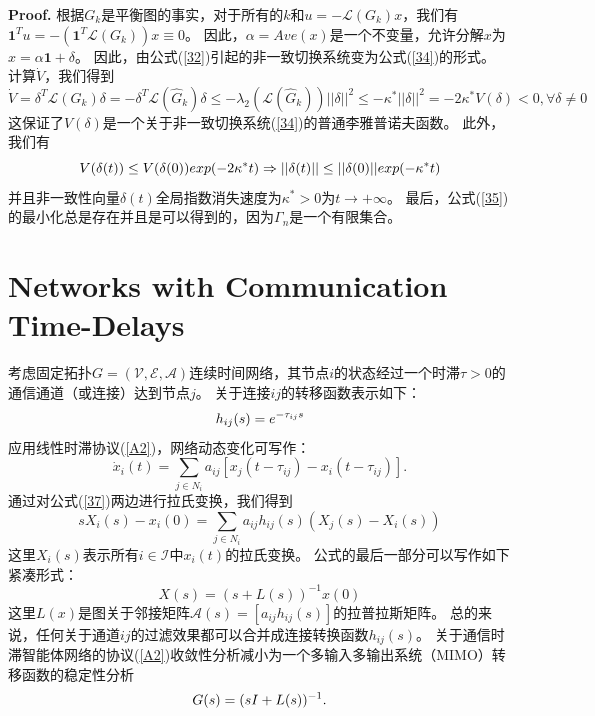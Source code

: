 \documentclass{article}
\begin{document}
\noindent \textbf{Proof.}
根据$G_k$是平衡图的事实，对于所有的$k$和$u=-\mathcal{L}(G_k)x$，我们有$\mathbf{1}^Tu=-(\mathbf{1}^T\mathcal{L}(G_k))x\equiv0$。
因此，$\alpha=Ave(x)$是一个不变量，允许分解$x$为$x=\alpha \mathbf{1}+\delta$。
因此，由公式(\ref{32})引起的非一致切换系统变为公式(\ref{34})的形式。
计算$\dot{V}$，我们得到
\begin{equation}
    \tag{36}
    \label{36}
    \dot{V} = \delta^T\mathcal{L}(G_k)\delta = -\delta^T\mathcal{L}(\hat{G}_k)\delta \le -\lambda_2(\mathcal{L}(\hat{G}_k))||\delta||^2 \le -\kappa^*||\delta||^2 = -2\kappa^*V(\delta)<0,\forall \delta \ne 0
\end{equation}
这保证了$V(\delta)$是一个关于非一致切换系统(\ref{34})的普通李雅普诺夫函数。
此外，我们有
\begin{equation}
    \notag
    V(\delta(t)) \le V(\delta(0))exp(-2\kappa^*t) \Rightarrow ||\delta(t)|| \le ||\delta(0)||exp(-\kappa^*t)
\end{equation}
并且非一致性向量$\delta(t)$全局指数消失速度为$\kappa^* > 0$为$t\rightarrow +\infty$。
最后，公式(\ref{35})的最小化总是存在并且是可以得到的，因为$\Gamma_n$是一个有限集合。


\section{Networks with Communication Time-Delays}
考虑固定拓扑$G=(\mathcal{V}, \mathcal{E}, \mathcal{A})$连续时间网络，其节点$i$的状态经过一个时滞$\tau > 0$的通信通道（或连接）达到节点$j$。
关于连接$ij$的转移函数表示如下：
\begin{equation}
    h_{ij}(s) = e^{-\tau_{ij}s}
    \notag
\end{equation}
应用线性时滞协议(\ref{A2})，网络动态变化可写作：
\begin{equation}
    \dot{x}_i(t) = \sum_{j\in N_i} a_{ij} [x_j(t-\tau_{ij}) - x_i(t-\tau_{ij})].
    \tag{37}
    \label{37}
\end{equation}
通过对公式(\ref{37})两边进行拉氏变换，我们得到
\begin{equation}
    sX_i(s) - x_i(0) = \sum_{j\in N_i} a_{ij} h_{ij}(s) (X_j(s) - X_i(s))
    \tag{38}
    \label{38}
\end{equation}
这里$X_i(s)$表示所有$i\in \mathcal{I}$中$x_i(t)$的拉氏变换。
公式的最后一部分可以写作如下紧凑形式：
\begin{equation}
    X(s) = (s+L(s))^{-1}x(0)
    \tag{39}
    \label{39}
\end{equation}
这里$L(x)$是图关于邻接矩阵$\mathcal{A}(s) = [a_{ij}h_{ij}(s)]$的拉普拉斯矩阵。
总的来说，任何关于通道$ij$的过滤效果都可以合并成连接转换函数$h_{ij}(s)$。
关于通信时滞智能体网络的协议(\ref{A2})收敛性分析减小为一个多输入多输出系统（MIMO）转移函数的稳定性分析
\begin{equation}
    G(s) = (sI+L(s))^{-1}.
    \notag
\end{equation}
\end{document}
